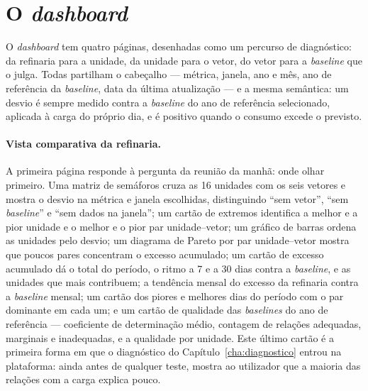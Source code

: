 \section{O \emph{dashboard}}
\label{sec:dashboard}

O \emph{dashboard} tem quatro páginas, desenhadas como um percurso de
diagnóstico: da refinaria para a unidade, da unidade para o vetor, do
vetor para a \emph{baseline} que o julga. Todas partilham o cabeçalho
--- métrica, janela, ano e mês, ano de referência da \emph{baseline}, data
da última atualização --- e a mesma semântica: um desvio é sempre medido
contra a \emph{baseline} do ano de referência selecionado, aplicada à carga
do próprio dia, e é positivo quando o consumo excede o previsto.

\paragraph{Vista comparativa da refinaria.} A primeira página responde à
pergunta da reunião da manhã: onde olhar primeiro. Uma matriz de
semáforos cruza as 16 unidades com os seis vetores e mostra o desvio na
métrica e janela escolhidas, distinguindo ``sem vetor'', ``sem
\emph{baseline}'' e ``sem dados na janela''; um cartão de extremos
identifica a melhor e a pior unidade e o melhor e o pior par
unidade--vetor; um gráfico de barras ordena as unidades pelo desvio; um
diagrama de Pareto por par unidade--vetor mostra que poucos pares
concentram o excesso acumulado; um cartão de excesso acumulado dá o total
do período, o ritmo a 7 e a 30 dias contra a \emph{baseline}, e as unidades
que mais contribuem; a tendência mensal do excesso da refinaria contra a
\emph{baseline} mensal; um cartão dos piores e melhores dias do período
com o par dominante em cada um; e um cartão de qualidade das
\emph{baselines} do ano de referência --- coeficiente de determinação
médio, contagem de relações adequadas, marginais e inadequadas, e a
qualidade por unidade. Este último cartão é a primeira forma em que o
diagnóstico do Capítulo~\ref{cha:diagnostico} entrou na plataforma: ainda
antes de qualquer teste, mostra ao utilizador que a maioria das relações
com a carga explica pouco.

